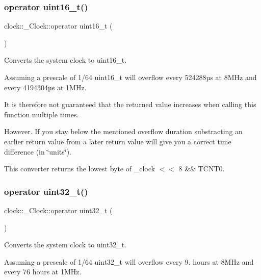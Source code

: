 \subsubsection{\texorpdfstring{operator uint16\+\_\+t()}{operator uint16\_t()}}
{\footnotesize\ttfamily clock\+::\+\_\+\+Clock\+::operator uint16\+\_\+t (\begin{DoxyParamCaption}{ }\end{DoxyParamCaption})\hspace{0.3cm}{\ttfamily [inline]}}



Converts the system clock to {\ttfamily uint16\+\_\+t}. 

Assuming a prescale of 1/64 {\ttfamily uint16\+\_\+t} will overflow every 524\textquotesingle{}288µs at 8\+M\+Hz and every 4\textquotesingle{}194\textquotesingle{}304µs at 1\+M\+Hz.

It is therefore not guaranteed that the returned value increases when calling this function multiple times.

However. If you stay below the mentioned overflow duration substracting an earlier return value from a later return value will give you a correct time difference (in \char`\"{}units\char`\"{}).

This converter returns the lowest byte of \+\_\+clock $<$$<$ 8 \&\& {\ttfamily T\+C\+N\+T0}. \hypertarget{classclock_1_1__Clock_a9eb2b6bbd2a98818df1d379125fd525c}{}\label{classclock_1_1__Clock_a9eb2b6bbd2a98818df1d379125fd525c} 
\subsubsection{\texorpdfstring{operator uint32\+\_\+t()}{operator uint32\_t()}}
{\footnotesize\ttfamily clock\+::\+\_\+\+Clock\+::operator uint32\+\_\+t (\begin{DoxyParamCaption}{ }\end{DoxyParamCaption})\hspace{0.3cm}{\ttfamily [inline]}}



Converts the system clock to {\ttfamily uint32\+\_\+t}. 

Assuming a prescale of 1/64 {\ttfamily uint32\+\_\+t} will overflow every 9. hours at 8\+M\+Hz and every 76 hours at 1\+M\+Hz.

